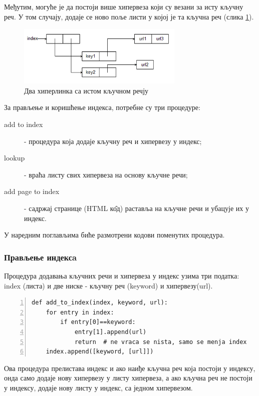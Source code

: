 Међутим, могуће је да постоји више хипервеза који су везани за исту кључну реч. У том случају, додаје се ново поље листи у којој је та кључна реч (слика \ref{slike:index3}).

\begin{figure}[here]
\centering
\includegraphics[height=110px, width=300px]{index3.png}
\caption{Два хиперлинка са истом кључном речју}
\label{slike:index3}
\end{figure}

За прављење и коришћење индекса, потребне су три процедуре:

\begin{description}
\item[add to index] - процедура која додаје кључну реч и хипервезу у индекс;
\item[lookup] - враћа листу свих хипервеза на основу кључне речи;
\item[add page to index] - садржај странице (HTML к\^{о}д) раставља на кључне речи и убацује их у индекс.
\end{description}

У наредним поглављима биће размотрени кодови поменутих процедура.

\subsubsection{Прављење индексa}

Процедура додавања кључних речи и хипервеза у индекс узима три податка: index (листа) и две ниске - кључну реч (keyword) и хипервезу(url).

\begin{lstlisting}[caption=Процедура add\_to\_index, label={lst:addtoindex}, numbers=left]
def add_to_index(index, keyword, url):
    for entry in index:
        if entry[0]==keyword:
            entry[1].append(url)
            return  # ne vraca se nista, samo se menja index
    index.append([keyword, [url]])
\end{lstlisting}

Ова процедура прелистава индекс и ако наиђе кључна реч која постоји у индексу, онда само додаје нову хипервезу у листу хипервеза, а ако кључна реч не постоји у индексу, додаје нову листу у индекс, са једном хипервезом.

